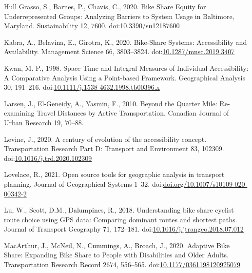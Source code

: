 \documentclass[]{elsarticle} %
\begin{document}
\leavevmode\hypertarget{ref-hullgrassoBikeShareEquity2020}{}%
Hull Grasso, S., Barnes, P., Chavis, C., 2020. Bike Share Equity for
Underrepresented Groups: Analyzing Barriers to System Usage in
Baltimore, Maryland. Sustainability 12, 7600.
doi:\href{https://doi.org/10.3390/su12187600}{10.3390/su12187600}

\leavevmode\hypertarget{ref-kabraBikeShareSystemsAccessibility2020}{}%
Kabra, A., Belavina, E., Girotra, K., 2020. Bike-Share Systems:
Accessibility and Availability. Management Science 66, 3803--3824.
doi:\href{https://doi.org/10.1287/mnsc.2019.3407}{10.1287/mnsc.2019.3407}

\leavevmode\hypertarget{ref-kwanSpaceTimeIntegral1998}{}%
Kwan, M.-P., 1998. Space-Time and Integral Measures of Individual
Accessibility: A Comparative Analysis Using a Point-based Framework.
Geographical Analysis 30, 191--216.
doi:\href{https://doi.org/10.1111/j.1538-4632.1998.tb00396.x}{10.1111/j.1538-4632.1998.tb00396.x}

\leavevmode\hypertarget{ref-larsenQuarterMileReexamining2010}{}%
Larsen, J., El-Geneidy, A., Yasmin, F., 2010. Beyond the Quarter Mile:
Re-examining Travel Distances by Active Transportation. Canadian Journal
of Urban Research 19, 70--88.

\leavevmode\hypertarget{ref-levineCenturyEvolutionAccessibility2020}{}%
Levine, J., 2020. A century of evolution of the accessibility concept.
Transportation Research Part D: Transport and Environment 83, 102309.
doi:\href{https://doi.org/10.1016/j.trd.2020.102309}{10.1016/j.trd.2020.102309}

\leavevmode\hypertarget{ref-lovelace2021open}{}%
Lovelace, R., 2021. Open source tools for geographic analysis in
transport planning. Journal of Geographical Systems 1--32.
doi:\href{https://doi.org/doi.org/10.1007/s10109-020-00342-2}{doi.org/10.1007/s10109-020-00342-2}

\leavevmode\hypertarget{ref-luUnderstandingBikeShare2018}{}%
Lu, W., Scott, D.M., Dalumpines, R., 2018. Understanding bike share
cyclist route choice using GPS data: Comparing dominant routes and
shortest paths. Journal of Transport Geography 71, 172--181.
doi:\href{https://doi.org/10.1016/j.jtrangeo.2018.07.012}{10.1016/j.jtrangeo.2018.07.012}

\leavevmode\hypertarget{ref-macarthurAdaptiveBikeShare2020}{}%
MacArthur, J., McNeil, N., Cummings, A., Broach, J., 2020. Adaptive Bike
Share: Expanding Bike Share to People with Disabilities and Older
Adults. Transportation Research Record 2674, 556--565.
doi:\href{https://doi.org/10.1177/0361198120925079}{10.1177/0361198120925079}
\end{document}
